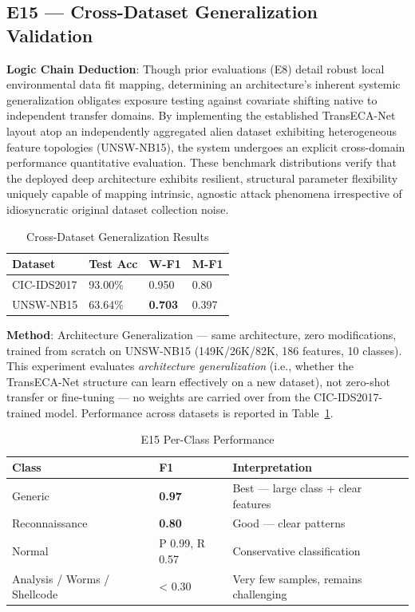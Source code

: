 \documentclass[sigconf]{acmart}
\begin{document}
\subsection{E15 --- Cross-Dataset Generalization Validation}
\textbf{Logic Chain Deduction}: Though prior evaluations (E8) detail robust local environmental data fit mapping, determining an architecture's inherent systemic generalization obligates exposure testing against covariate shifting native to independent transfer domains. By implementing the established TransECA-Net layout atop an independently aggregated alien dataset exhibiting heterogeneous feature topologies (UNSW-NB15), the system undergoes an explicit cross-domain performance quantitative evaluation. These benchmark distributions verify that the deployed deep architecture exhibits resilient, structural parameter flexibility uniquely capable of mapping intrinsic, agnostic attack phenomena irrespective of idiosyncratic original dataset collection noise.


\begin{table}[!t]
\caption{Cross-Dataset Generalization Results}
\label{tab:cross_gen}
\begin{tabular}{p{4.0cm}p{3.5cm}p{3.5cm}p{3.4cm}}
\toprule
\textbf{Dataset} & \textbf{Test Acc} & \textbf{W-F1} & \textbf{M-F1} \\
\midrule
CIC-IDS2017 & 93.00\% & 0.950 & 0.80 \\
UNSW-NB15 & 63.64\% & \textbf{0.703} & 0.397 \\
\bottomrule
\end{tabular}
\end{table}

\textbf{Method}: Architecture Generalization --- same architecture, zero modifications, trained from scratch on UNSW-NB15 (149K/26K/82K, 186 features, 10 classes). This experiment evaluates \emph{architecture generalization} (i.e., whether the TransECA-Net structure can learn effectively on a new dataset), not zero-shot transfer or fine-tuning --- no weights are carried over from the CIC-IDS2017-trained model. Performance across datasets is reported in Table~\ref{tab:cross_gen}.


\begin{table}[!t]
\caption{E15 Per-Class Performance}
\label{tab:e15_per_class}
\begin{tabular}{p{5.0cm}p{3.0cm}p{8.4cm}}
\toprule
\textbf{Class} & \textbf{F1} & \textbf{Interpretation} \\
\midrule
Generic & \textbf{0.97} & Best --- large class + clear features \\
Reconnaissance & \textbf{0.80} & Good --- clear patterns \\
Normal & P 0.99, R 0.57 & Conservative classification \\
Analysis / Worms / Shellcode & < 0.30 & Very few samples, remains challenging \\
\bottomrule
\end{tabular}
\end{table}
\end{document}
